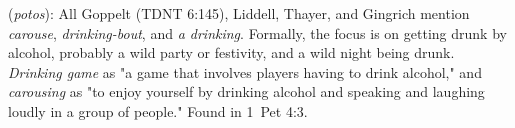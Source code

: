 \item[Carouse,]

(\textit{potos}):
All Goppelt (TDNT 6:145), Liddell, Thayer, and Gingrich mention \emph{carouse}, \emph{drinking-bout}, and \emph{a drinking}. Formally, the focus is on getting drunk by alcohol, probably a wild party or festivity, and a wild night being drunk. \emph{Drinking game} as "a game that involves players having to drink alcohol," and \emph{carousing} as "to enjoy yourself by drinking alcohol and speaking and laughing loudly in a group of people."
Found in 1~Pet 4:3.
